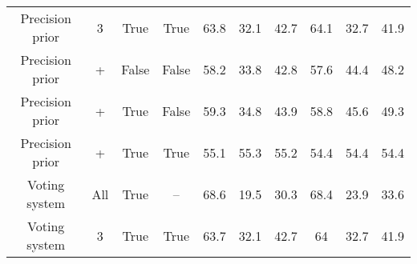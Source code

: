 \begin{table}[h!]
{\begin{tabular}{|c|ccc|ccc|ccc|}
    Precision prior                  & 3                                                                                                    & True                                                                                                      & True                               & 63.8                                 & 32.1                                    & 42.7              & 64.1                                 & 32.7                                    & 41.9              \\
    Precision prior                  & +                                                                                                    & False                                                                                                     & False                              & 58.2                                 & 33.8                                    & 42.8              & 57.6                                 & 44.4                                    & 48.2              \\
    Precision prior                  & +                                                                                                    & True                                                                                                      & False                              & 59.3                                 & 34.8                                    & 43.9              & 58.8                                 & 45.6                                    & 49.3              \\
    Precision prior                  & +                                                                                                    & True                                                                                                      & True                               & 55.1                                 & 55.3                                    & 55.2              & 54.4                                 & 54.4                                    & 54.4              \\ \hline
    Voting system                    & All                                                                                                  & True                                                                                                      & --                        & 68.6                        & 19.5                           & 30.3     & 68.4                        & 23.9                           & 33.6     \\
    Voting system                    & 3                                                                                                    & True                                                                                                      & True                               & 63.7                                 & 32.1                                    & 42.7              & 64                                   & 32.7                                    & 41.9              \\

\end{tabular}}
\end{table}
